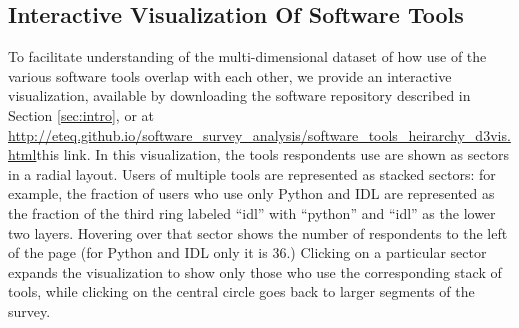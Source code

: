 \subsection{Interactive Visualization Of Software Tools}
\label{ssec:d3viz}

To facilitate understanding of the multi-dimensional dataset of how use of the various software tools overlap with each other, we provide an interactive visualization, available by downloading the software repository described in Section \ref{sec:intro}, or at \url{http://eteq.github.io/software_survey_analysis/software_tools_heirarchy_d3vis.html}{this link}. In this visualization, the tools respondents use are shown as sectors in a radial layout.  Users of multiple tools are represented as stacked sectors: for example, the fraction of users who use only Python and IDL are represented as the fraction of the third ring labeled ``idl'' with ``python'' and ``idl'' as the lower two layers.  Hovering over that sector shows the number of respondents to the left of the page (for Python and IDL only it is 36.)  Clicking on a particular sector expands the visualization to show only those who use the corresponding stack of tools, while clicking on the central circle goes back to larger segments of the survey.